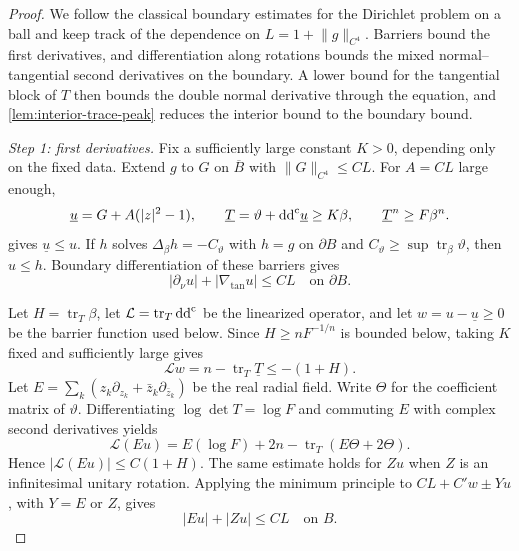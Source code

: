 \begin{proof}
We follow the classical boundary estimates for the Dirichlet problem on a ball and keep track of the dependence on $L=1+\lVert g\rVert_{C^4}$. Barriers bound the first derivatives, and differentiation along rotations bounds the mixed normal--tangential second derivatives on the boundary. A lower bound for the tangential block of $T$ then bounds the double normal derivative through the equation, and \cref{lem:interior-trace-peak} reduces the interior bound to the boundary bound.

\emph{Step 1: first derivatives.} Fix a sufficiently large constant $K>0$, depending only on the fixed data. Extend $g$ to $G$ on $\overline B$ with $\lVert G\rVert_{C^4}\leq CL$. For $A=CL$ large enough,
\[
  \underline u=G+A(|z|^2-1),
  \qquad
  \underline T=\vartheta+\mathrm{dd}^{\mathrm{c}}\underline u\geq K\beta,
  \qquad
  \underline T^n\geq F\beta^n.
\]
 gives $\underline u\leq u$. If $h$ solves $\Delta_\beta h=-C_\vartheta$ with $h=g$ on $\partial B$ and $C_\vartheta\geq\sup\operatorname{tr}_\beta\vartheta$, then $u\leq h$. Boundary differentiation of these barriers gives
\begin{equation}\label{eq:interior-first-boundary}
  |\partial_\nu u|+|\nabla_{\tan}u|\leq CL
  \quad\text{on }\partial B.
\end{equation}

Let $H=\operatorname{tr}_T\beta$, let $\mathcal L=\operatorname{tr}_T\mathrm{dd}^{\mathrm{c}}$ be the linearized operator, and let $w=u-\underline u\geq0$ be the barrier function used below. Since $H\geq nF^{-1/n}$ is bounded below, taking $K$ fixed and sufficiently large gives
\begin{equation}\label{eq:interior-w-barrier}
  \mathcal Lw=n-\operatorname{tr}_T\underline T\leq-(1+H).
\end{equation}
Let $E=\sum_k(z_k\partial_{z_k}+\bar z_k\partial_{\bar z_k})$ be the real radial field. Write $\Theta$ for the coefficient matrix of $\vartheta$. Differentiating $\log\det T=\log F$ and commuting $E$ with complex second derivatives yields
\[
  \mathcal L(Eu)=E(\log F)+2n-\operatorname{tr}_T(E\Theta+2\Theta).
\]
Hence $|\mathcal L(Eu)|\leq C(1+H)$. The same estimate holds for $Zu$ when $Z$ is an infinitesimal unitary rotation. Applying the minimum principle to $CL+C'w\pm Yu$, with $Y=E$ or $Z$, gives
\begin{equation}\label{eq:interior-first-fields}
  |Eu|+|Zu|\leq CL\quad\text{on }B.
\end{equation}


\end{proof}
